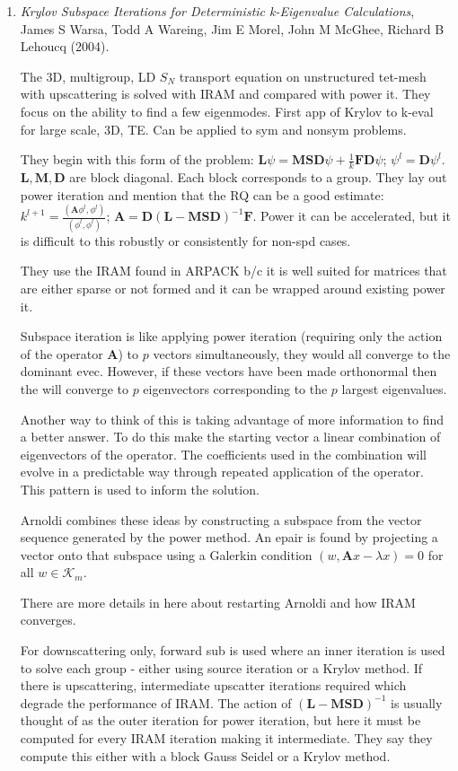 \documentclass[12pt,twoside]{book}
\newcommand{\ve}[1]{\ensuremath{\mathbf{#1}}}
\begin{document}
\begin{enumerate}
\item \emph{Krylov Subspace Iterations for Deterministic k-Eigenvalue Calculations}, James S Warsa, Todd A Wareing, Jim E Morel, John M McGhee, Richard B Lehoucq (2004).

  The 3D, multigroup, LD $S_N$ transport equation on unstructured tet-mesh with upscattering is solved with IRAM and compared with power it. They focus on the ability to find a few eigenmodes. First app of Krylov to k-eval for large scale, 3D, TE. Can be applied to sym and nonsym problems.
  
  They begin with this form of the problem: $\ve{L}\psi = \ve{MSD}\psi + \frac{1}{k}\ve{FD}\psi$; $\psi^l = \ve{D}\psi^l$. $\ve{L}, \ve{M}, \ve{D}$ are block diagonal. Each block corresponds to a group. They lay out power iteration and mention that the RQ can be a good estimate: $k^{l+1} = \frac{(\ve{A}\phi^l, \phi^l)}{(\phi^l, \phi^l)}$; $\ve{A} = \ve{D}(\ve{L} - \ve{MSD})^{-1}\ve{F}$. Power it can be accelerated, but it is difficult to this robustly or consistently for non-spd cases.
  
  They use the IRAM found in ARPACK b/c it is well suited for matrices that are either sparse or not formed and it can be wrapped around existing power it.
  
  Subspace iteration is like applying power iteration (requiring only the action of the operator $\ve{A}$) to $p$ vectors simultaneously, they would all converge to the dominant evec. However, if these vectors have been made orthonormal then the will converge to $p$ eigenvectors corresponding to the $p$ largest eigenvalues.
  
  Another way to think of this is taking advantage of more information to find a better answer. To do this make the starting vector a linear combination of eigenvectors of the operator. The coefficients used in the combination will evolve in a predictable way through repeated application of the operator. This pattern is used to inform the solution.
  
  Arnoldi combines these ideas by constructing a subspace from the vector sequence generated by the power method. An epair is found by projecting a vector onto that subspace using a Galerkin condition $(w, \ve{A}x - \lambda x) = 0$ for all $w \in \mathcal{K}_m$.
  
  There are more details in here about restarting Arnoldi and how IRAM converges.  
  
  For downscattering only, forward sub is used where an inner iteration is used to solve each group - either using source iteration or a Krylov method. If there is upscattering, intermediate upscatter iterations required which degrade the performance of IRAM. The action of $(\ve{L} - \ve{MSD})^{-1}$ is usually thought of as the outer iteration for power iteration, but here it must be computed for every IRAM iteration making it intermediate. They say they compute this either with a block Gauss Seidel or a Krylov method.
  

\end{enumerate}
\end{document}

